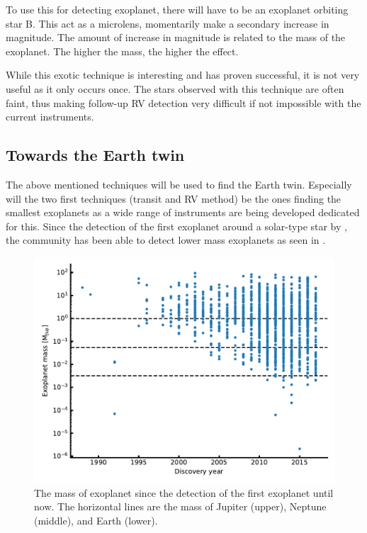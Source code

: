 To use this for detecting exoplanet, there will have to be an exoplanet orbiting star B. This act as
a microlens, momentarily make a secondary increase in magnitude. The amount of increase in magnitude
is related to the mass of the exoplanet. The higher the mass, the higher the effect.

While this exotic technique is interesting and has proven successful, it is not very useful as it
only occurs once. The stars observed with this technique are often faint, thus making follow-up RV
detection very difficult if not impossible with the current instruments.


\subsection{Towards the Earth twin}

The above mentioned techniques will be used to find the Earth twin. Especially will the two first
techniques (transit and RV method) be the ones finding the smallest exoplanets as a wide range of
instruments are being developed dedicated for this. Since the detection of the first exoplanet around a solar-type star by \citet{Mayor1995}, the
community has been able to detect lower mass exoplanets as seen in .

\begin{figure}[htpb!]
    \centering
    \includegraphics[width=0.8\linewidth]{figures/exoplanetMass.pdf}
    \caption{The mass of exoplanet since the detection of the first exoplanet until now. The
             horizontal lines are the mass of Jupiter (upper), Neptune (middle), and Earth (lower).}
    \label{fig:exoplanetMass}
\end{figure}

